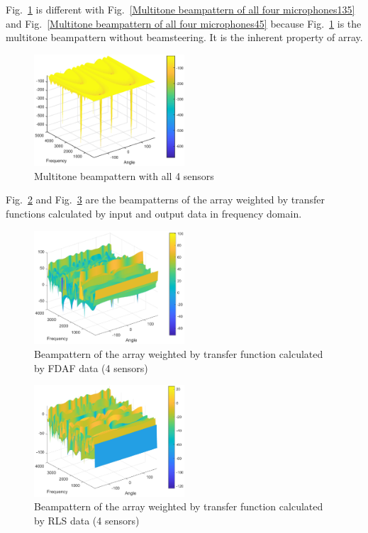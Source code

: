 \documentclass[onecolumn, conference]{IEEEtran}
\begin{document}
Fig.~\ref{Multitone beampattern with all 4 sensors} is different with Fig.~\ref{Multitone beampattern of all four microphones135} and Fig.~\ref{Multitone beampattern of all four microphones45} because Fig.~\ref{Multitone beampattern with all 4 sensors} is the multitone beampattern without beamsteering. It is the inherent property of array.

\begin{figure}[htbp]
	\centerline{\includegraphics[width=0.5\textwidth]{img/multi_all4.eps}}
	\caption{Multitone beampattern with all 4 sensors}
	\label{Multitone beampattern with all 4 sensors}
\end{figure}

Fig.~\ref{Transfer function calculated by FDAF data} and Fig.~\ref{Transfer function calculated by RLS data (4 sensors)} are the beampatterns of the array weighted by transfer functions calculated by input and output data in frequency domain.
\begin{figure}[htbp]
	\centerline{\includegraphics[width=0.5\textwidth]{img/trans_FDAF_4sensor.eps}}
	\caption{Beampattern of the array weighted by transfer function calculated by FDAF data (4 sensors)}
	\label{Transfer function calculated by FDAF data}
\end{figure}
\begin{figure}[htbp]
	\centerline{\includegraphics[width=0.5\textwidth]{img/trans_RLS_4sensor.eps}}
	\caption{Beampattern of the array weighted by transfer function calculated by RLS data (4 sensors)}
	\label{Transfer function calculated by RLS data (4 sensors)}
\end{figure}
\end{document}
